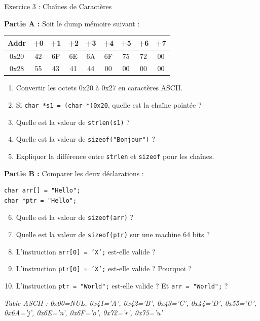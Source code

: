 \documentclass[10pt,a4paper]{article}
\begin{document}
\begin{exercicebox}{Exercice 3 : Chaînes de Caractères}

\textbf{Partie A :} Soit le dump mémoire suivant :

\begin{center}
\renewcommand{\arraystretch}{1.2}
\begin{tabular}{|c|c|c|c|c|c|c|c|c|}
\hline
\textbf{Addr} & \textbf{+0} & \textbf{+1} & \textbf{+2} & \textbf{+3} & \textbf{+4} & \textbf{+5} & \textbf{+6} & \textbf{+7} \\
\hline
0x20 & 42 & 6F & 6E & 6A & 6F & 75 & 72 & 00 \\
\hline
0x28 & 55 & 43 & 41 & 44 & 00 & 00 & 00 & 00 \\
\hline
\end{tabular}
\end{center}

\begin{enumerate}[label=\alph*)]
    \item Convertir les octets 0x20 à 0x27 en caractères ASCII.
    \item Si \texttt{char *s1 = (char *)0x20}, quelle est la chaîne pointée ?
    \item Quelle est la valeur de \texttt{strlen(s1)} ?
    \item Quelle est la valeur de \texttt{sizeof("Bonjour")} ?
    \item Expliquer la différence entre \texttt{strlen} et \texttt{sizeof} pour les chaînes.
\end{enumerate}

\textbf{Partie B :} Comparer les deux déclarations :

\begin{lstlisting}[numbers=none]
char arr[] = "Hello";
char *ptr = "Hello";
\end{lstlisting}

\begin{enumerate}[label=\alph*)]
    \setcounter{enumi}{5}
    \item Quelle est la valeur de \texttt{sizeof(arr)} ?
    \item Quelle est la valeur de \texttt{sizeof(ptr)} sur une machine 64 bits ?
    \item L'instruction \texttt{arr[0] = 'X';} est-elle valide ?
    \item L'instruction \texttt{ptr[0] = 'X';} est-elle valide ? Pourquoi ?
    \item L'instruction \texttt{ptr = "World";} est-elle valide ? Et \texttt{arr = "World";} ?
\end{enumerate}

\textit{Table ASCII : 0x00=NUL, 0x41='A', 0x42='B', 0x43='C', 0x44='D', 0x55='U', 0x6A='j', 0x6E='n', 0x6F='o', 0x72='r', 0x75='u'}

\end{exercicebox}
\end{document}
